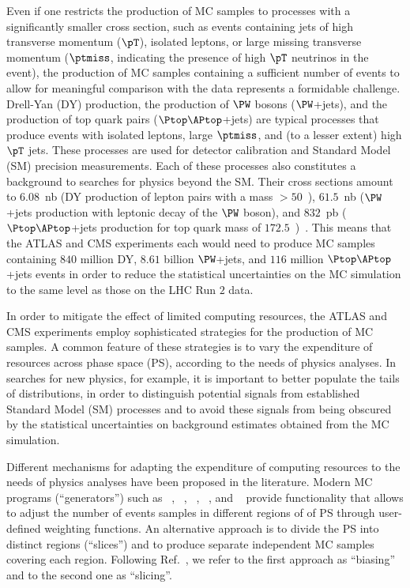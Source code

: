 Even if one restricts the production of MC samples to processes with a significantly smaller cross section,
such as events containing jets of high transverse momentum ($\pT$), isolated leptons, or large missing transverse momentum ($\ptmiss$, indicating the presence of high $\pT$ neutrinos in the event),
the production of MC samples containing a sufficient number of events to allow for meaningful comparison with the data represents a formidable challenge.
Drell-Yan (DY) production, the production of $\PW$ bosons ($\PW$+jets), and the production of top quark pairs ($\Ptop\APtop$+jets) are typical processes
that produce events with isolated leptons, large $\ptmiss$, and (to a lesser extent) high $\pT$ jets.
These processes are used for detector calibration and Standard Model (SM) precision measurements.
Each of these processes also constitutes a background to searches for physics beyond the SM.
Their cross sections amount to $6.08$~nb (DY production of lepton pairs with a mass $> 50$~\GeV),
$61.5$~nb ($\PW$+jets production with leptonic decay of the $\PW$ boson), 
and $832$~pb ($\Ptop\APtop$+jets production for top quark mass of $172.5$~\GeV)~\cite{Melnikov:2006kv,Czakon:2011xx}.
This means that the ATLAS and CMS experiments each would need to produce MC samples containing $840$ million DY, $8.61$ billion $\PW$+jets, and $116$ million $\Ptop\APtop$+jets events
in order to reduce the statistical uncertainties on the MC simulation to the same level as those on the LHC Run $2$ data.

In order to mitigate the effect of limited computing resources, the ATLAS and CMS experiments employ sophisticated strategies for the production of MC samples.
A common feature of these strategies is to vary the expenditure of resources across phase space (PS),
according to the needs of physics analyses.
In searches for new physics, for example, it is important to better populate the tails of distributions,
in order to distinguish potential signals from established Standard Model (SM) processes
and to avoid these signals from being obscured by the statistical uncertainties on background estimates obtained from the MC simulation.

Different mechanisms for adapting the expenditure of computing resources to the needs of physics analyses have been proposed in the literature.
Modern MC programs (``generators'') such as \POWHEG~\cite{POWHEG1,POWHEG2,POWHEG3}, \MGvATNLO~\cite{MGvATNLO}, \SHERPA~\cite{SHERPA}, \PYTHIA~\cite{PYTHIA}, and \HERWIG~\cite{HERWIG}
provide functionality that allows to adjust the number of events samples in different regions of of PS through user-defined weighting functions.
An alternative approach is to divide the PS into distinct regions (``slices'') and to produce separate independent MC samples covering each region.
Following Ref.~\cite{HSFPhysicsEventGeneratorWG:2020gxw}, we refer to the first approach as ``biasing'' and to the second one as ``slicing''.

